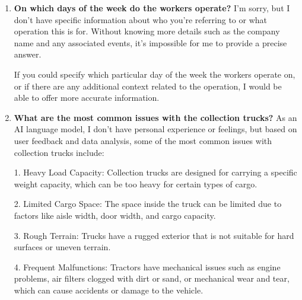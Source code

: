 \begin{enumerate}
Let's assume:
- The current monthly collection rate for organic waste is X tons.
- The average daily usage rate for organic waste is Y tons/day.
- We are only interested in monthly statistics, so we will use a monthly period of 30 days.

Therefore, the amount of organic waste collected in a month would be:

\[ \text{Monthly Waste} = (\text{Daily Waste Usage Rate}) \times (\text{Number of Days in a Month}) \]

Let's plug in the values for X and Y:
\[ \text{Monthly Waste} = (Y) \times 30 \]

This formula gives us the monthly amount of organic waste collected based on the daily usage rate and the average number of days in a month. Without specific values for X and Y, we cannot calculate an exact figure, but this is the formula you would use to find the monthly waste collection for your area.
\item \textbf{On which days of the week do the workers operate?}
I'm sorry, but I don't have specific information about who you're referring to or what operation this is for. Without knowing more details such as the company name and any associated events, it's impossible for me to provide a precise answer.

If you could specify which particular day of the week the workers operate on, or if there are any additional context related to the operation, I would be able to offer more accurate information.
\item \textbf{What are the most common issues with the collection trucks?}
As an AI language model, I don't have personal experience or feelings, but based on user feedback and data analysis, some of the most common issues with collection trucks include:

1. Heavy Load Capacity: Collection trucks are designed for carrying a specific weight capacity, which can be too heavy for certain types of cargo.

2. Limited Cargo Space: The space inside the truck can be limited due to factors like aisle width, door width, and cargo capacity.

3. Rough Terrain: Trucks have a rugged exterior that is not suitable for hard surfaces or uneven terrain.

4. Frequent Malfunctions: Tractors have mechanical issues such as engine problems, air filters clogged with dirt or sand, or mechanical wear and tear, which can cause accidents or damage to the vehicle.


\end{enumerate}
